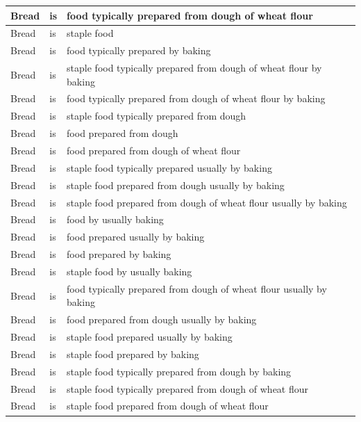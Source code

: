 \documentclass[12pt]{article}
\theoremstyle{grammarstyle}
\begin{document}
\begin{longtable}{|l|l|p{8cm}|}
    \hline
    Bread    &	is	&    food typically prepared from dough of wheat flour \\
    \hline
    Bread    &	is	&    staple food \\
    \hline
    Bread    &	is	&    food typically prepared by baking \\
    \hline
    Bread    &	is	&    staple food typically prepared from dough of wheat flour by baking \\
    \hline
    Bread    &	is	&    food typically prepared from dough of wheat flour by baking \\
    \hline
    Bread    &	is	&    staple food typically prepared from dough \\
    \hline
    Bread    &	is	&    food prepared from dough \\
    \hline
    Bread    &	is	&    food prepared from dough of wheat flour \\
    \hline
    Bread    &	is	&    staple food typically prepared usually by baking \\
    \hline
    Bread    &	is	&    staple food prepared from dough usually by baking \\
    \hline
    Bread    &	is	&    staple food prepared from dough of wheat flour usually by baking \\
    \hline
    Bread    &	is &    food by	usually baking \\
    \hline
    Bread    &	is	&    food prepared usually by baking \\
    \hline
    Bread    &	is	&    food prepared by baking \\
    \hline
    Bread    &	is &    staple food by	usually baking \\
    \hline
    Bread    &	is	&    food typically prepared from dough of wheat flour usually by baking \\
    \hline
    Bread    &	is	&    food prepared from dough usually by baking \\
    \hline
    Bread    &	is	&    staple food prepared usually by baking \\
    \hline
    Bread    &	is	&    staple food prepared by baking \\
    \hline
    Bread    &	is	&    staple food typically prepared from dough by baking \\
    \hline
    Bread    &	is	&    staple food typically prepared from dough of wheat flour \\
    \hline
    Bread    &	is	&    staple food prepared from dough of wheat flour \\

\end{longtable}
\end{document}
